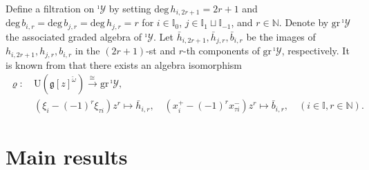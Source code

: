 \documentclass[11pt,reqno]{amsart}
\numberwithin{equation}{section}
\theoremstyle{definition}
\theoremstyle{remark}
\newcommand{\beq}{\begin{equation}}
\newcommand{\eeq}{\end{equation}}
\newcommand{\bN}{\mathbb{N}}
\newcommand{\g}{\mathfrak{g}}
\newcommand{\gr}{{\mathrm{gr}}}
\newcommand{\I}{{\mathbb I}}
\newcommand{\Yi}{{^\imath\mathscr{Y}}}
\begin{document}
Define a filtration on $\Yi$ by setting $\mathrm{deg}\,h_{i,2r+1}=2r+1$ and $\mathrm{deg}\,b_{i,r}=\mathrm{deg}\,b_{j,r}=\mathrm{deg}\,h_{j,r}=r$ for $i\in\I_0$, $j\in\I_1\sqcup\I_{-1}$, and $r\in\bN$. Denote by $\gr\,\Yi$ the associated graded algebra of $\Yi$. Let $\bar h_{i,2r+1},\bar h_{j,r},\bar b_{i,r}$ be the images of $ h_{i,2r+1},h_{j,r}, b_{i,r}$ in the $(2r+1)$-st and $r$-th components of $\mathrm{gr}\,\Yi$, respectively. It is known from \cite[Corollary~3.8]{LZ24} that there exists an algebra isomorphism
\beq\label{assi}
\begin{split}
\varrho:~&\mathrm{U}(\g[z]^{\check\omega})\stackrel{\cong\,}{\longrightarrow} \mathrm{gr}\,\Yi,\\
&(\xi_i-(-1)^r\xi_{\tau i})z^{r}\mapsto \bar h_{i,r},\quad (x_i^+-(-1)^rx_{\tau i}^-)z^r \mapsto \bar b_{i,r},\quad (i\in \I,r\in\bN).
\end{split}
\eeq

\section{Main results} \label{sec:main-results}
\end{document}
